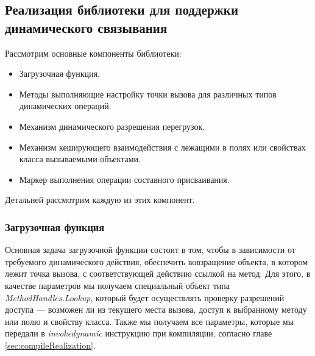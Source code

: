 \subsection{Реализация библиотеки для поддержки динамического связывания}
\label{sec:dynamicLibrary}

Рассмотрим основные компоненты библиотеки:

\begin{itemize}
    \item Загрузочная функция.
    \item Методы выполняющие настройку точки вызова для различных типов динамических операций.
    \item Механизм динамического разрешения перегрузок.
    \item Механизм кеширующего взаимодействия с лежащими в полях или свойствах класса вызываемыми объектами.
    \item Маркер выполнения операции составного присваивания.
\end{itemize}

Детальней рассмотрим каждую из этих компонент.

\subsubsection{Загрузочная функция}

Основная задача загрузочной функции состоит в том, чтобы в зависимости от требуемого динамического действия, обеспечить вовзращение объекта, в котором лежит точка вызова, с соответствующей действию ссылкой на метод. Для этого, в качестве параметров мы получаем специальный объект типа \textit{MethodHandles.Lookup}, который будет осуществлять проверку разрешений доступа --- возможен ли из текущего места вызова, доступ к выбранному методу или полю и свойству класса. Также мы получаем все параметры, которые мы передали в \textit{invokedynamic} инструкцию при компиляции, согласно главе \ref{sec:compileRealization}.

